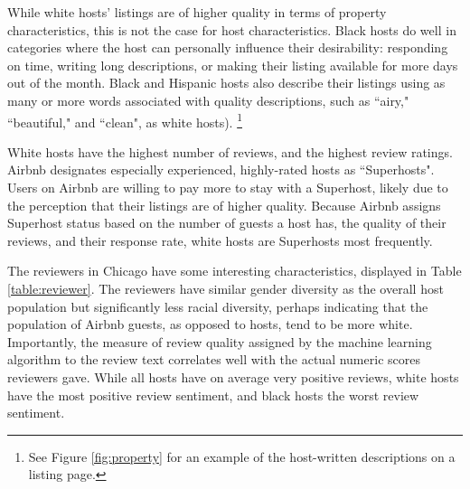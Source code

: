 While white hosts' listings are of higher quality in terms of property characteristics, this is not the case for host characteristics. Black hosts do well in categories where the host can personally influence their desirability: responding on time, writing long descriptions, or making their listing available for more days out of the month. %
Black and Hispanic hosts also describe their listings using as many or more words associated with quality descriptions, such as ``airy," ``beautiful," and ``clean", as white hosts).%
	\footnote{See Figure \ref{fig:property} for an example of the host-written descriptions on a listing page.} 
	

White hosts have the highest number of reviews, and the highest review ratings. Airbnb designates especially experienced, highly-rated hosts as ``Superhosts". Users on Airbnb are willing to pay more to stay with a Superhost, likely due to the perception that their listings are of higher quality. Because Airbnb assigns Superhost status based on the number of guests a host has, the quality of their reviews, and their response rate, white hosts are Superhosts most frequently. %

The reviewers in Chicago have some interesting characteristics, displayed in Table \ref{table:reviewer}. The reviewers have similar gender diversity as the overall host population but significantly less racial diversity, perhaps indicating that the population of Airbnb guests, as opposed to hosts, tend to be  more white. Importantly, the measure of review quality assigned by the machine learning algorithm to the review text correlates  well with the actual numeric scores reviewers gave. While all hosts have on average very positive reviews, white hosts have the most positive review sentiment, and black hosts the worst review sentiment.





